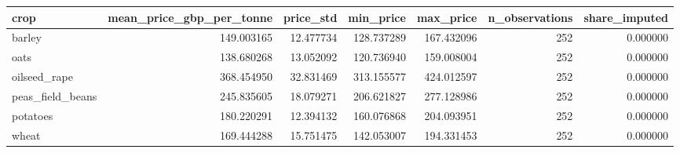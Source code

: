\begin{tabular}{lrrrrrr}
\toprule
crop & mean\_price\_gbp\_per\_tonne & price\_std & min\_price & max\_price & n\_observations & share\_imputed \\
\midrule
barley & 149.003165 & 12.477734 & 128.737289 & 167.432096 & 252 & 0.000000 \\
oats & 138.680268 & 13.052092 & 120.736940 & 159.008004 & 252 & 0.000000 \\
oilseed\_rape & 368.454950 & 32.831469 & 313.155577 & 424.012597 & 252 & 0.000000 \\
peas\_field\_beans & 245.835605 & 18.079271 & 206.621827 & 277.128986 & 252 & 0.000000 \\
potatoes & 180.220291 & 12.394132 & 160.076868 & 204.093951 & 252 & 0.000000 \\
wheat & 169.444288 & 15.751475 & 142.053007 & 194.331453 & 252 & 0.000000 \\
\bottomrule
\end{tabular}
